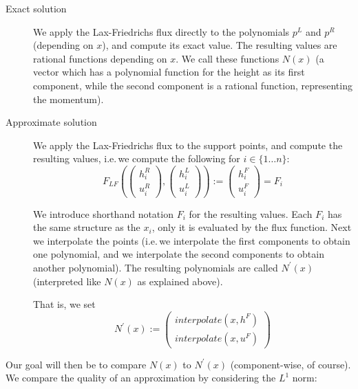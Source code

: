 \documentclass[a4paper, twoside]{article}
\begin{document}
\begin{description}
\item[Exact solution] We apply the Lax-Friedrichs flux directly to the polynomials $p^L$ and $p^R$ (depending on $x$), and compute its exact value. The resulting values are rational functions depending on $x$. We call these functions $N\left(x\right)$ (a vector which has a polynomial function for the height as its first component, while the second component is a rational function, representing the momentum).

\item[Approximate solution] We apply the Lax-Friedrichs flux to the support points, and compute the resulting values, i.e.\,we compute the following for $i \in \{1 \dots n\}$:
  \begin{equation*}
    F_{LF}\left(
      \begin{pmatrix}
        h_i^R \\ u_i^R
      \end{pmatrix},
      \begin{pmatrix}
        h_i^L \\ u_i^L
      \end{pmatrix}
    \right) :=
    \begin{pmatrix}
      h_i^F \\ u_i^F
    \end{pmatrix} = F_i
  \end{equation*}

  We introduce shorthand notation $F_i$ for the resulting values. Each $F_i$ has the same structure as the $x_i$, only it is evaluated by the flux function. Next we interpolate the points (i.e.\,we interpolate the first components to obtain one polynomial, and we interpolate the second components to obtain another polynomial). The resulting polynomials are called $N^\prime\left(x\right)$ (interpreted like $N\left(x\right)$ as explained above).

  That is, we set
  \begin{equation*}
    N^\prime\left(x\right) :=
    \begin{pmatrix}
      interpolate\left(x,h^F\right) \\ interpolate\left(x,u^F\right)
    \end{pmatrix}
  \end{equation*}

\end{description}

Our goal will then be to compare $N\left(x\right)$ to $N^\prime\left(x\right)$ (component-wise, of course). We compare the quality of an approximation by considering the $L^1$ norm:
\end{document}
